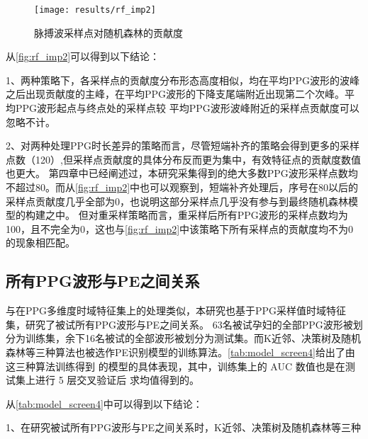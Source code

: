 \begin{figure}[htbp]
      \centering
      \texttt{[image: results/rf\_imp2]}
      \caption{\label{fig:rf_imp2}脉搏波采样点对随机森林的贡献度}
\end{figure}

从\autoref{fig:rf_imp2}可以得到以下结论：

1、两种策略下，各采样点的贡献度分布形态高度相似，均在平均PPG波形的波峰之后出现贡献度的主峰，在平均PPG波形的下降支尾端附近出现第二个次峰。平均PPG波形起点与终点处的采样点较
平均PPG波形波峰附近的采样点贡献度可以忽略不计。

2、对两种处理PPG时长差异的策略而言，尽管短端补齐的策略会得到更多的采样点数（120）,但采样点贡献度的具体分布反而更为集中，有效特征点的贡献度数值也更大。
第四章中已经阐述过，本研究采集得到的绝大多数PPG波形采样点数均不超过80。而从\autoref{fig:rf_imp2}中也可以观察到，短端补齐处理后，序号在80以后的采样点贡献度几乎全部为0，也说明这部分采样点几乎没有参与到最终随机森林模型的构建之中。
但对重采样策略而言，重采样后所有PPG波形的采样点数均为100，且不完全为0，这也与\autoref{fig:rf_imp2}中该策略下所有采样点的贡献度均不为0的现象相匹配。

\subsection{所有PPG波形与PE之间关系}

与在PPG多维度时域特征集上的处理类似，本研究也基于PPG采样值时域特征集，研究了被试所有PPG波形与PE之间关系。
63名被试孕妇的全部PPG波形被划分为训练集，余下16名被试的全部波形被划分为测试集。而K近邻、决策树及随机森林等三种算法也被选作PE识别模型的训练算法。\autoref{tab:model_screen4}给出了由这三种算法训练得到
的模型的具体表现，其中，训练集上的 AUC 数值也是在测试集上进行 5 层交叉验证后
求均值得到的。

从\autoref{tab:model_screen4}中可以得到以下结论：

1、在研究被试所有PPG波形与PE之间关系时，K近邻、决策树及随机森林等三种

